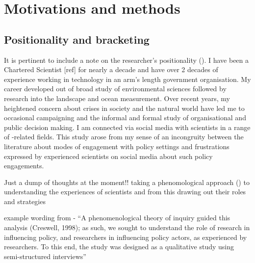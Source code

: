 \chapter{Motivations and methods}\label{ch:methods}


\section{Positionality and bracketing}

It is pertinent  to include a note on the researcher's positionality (\cite{CreswellP2017}). I have been a Chartered Scientist [ref] for nearly a decade and have over 2 decades of experience working in technology in an arm's length government organisation. My career developed out of broad study of environmental sciences followed by research into the landscape and ocean measurement. Over recent years, my heightened concern about crises in society and the natural world have led me to occasional campaigning and the informal and formal study of organisational and public decision making. I am connected via social media with scientists in a range of \CAN-related fields. This study arose from my sense of an incongruity between the literature about modes of engagement with policy settings and frustrations expressed by experienced scientists on social media about such policy engagements.



Just a dump of thoughts at the moment!!
taking a phenomological approach (\cite{CreswellP2017}) to understanding the experiences of scientists and from this drawing out their roles and strategies

example wording from \cite{KothariME2009} - ``A phenomenological theory of inquiry guided this analysis (Creswell, 1998); as such, we sought to understand the role of research in influencing policy, and researchers in influencing policy actors, as experienced by researchers. To this end, the study was designed as a qualitative study using semi-structured interviews''

